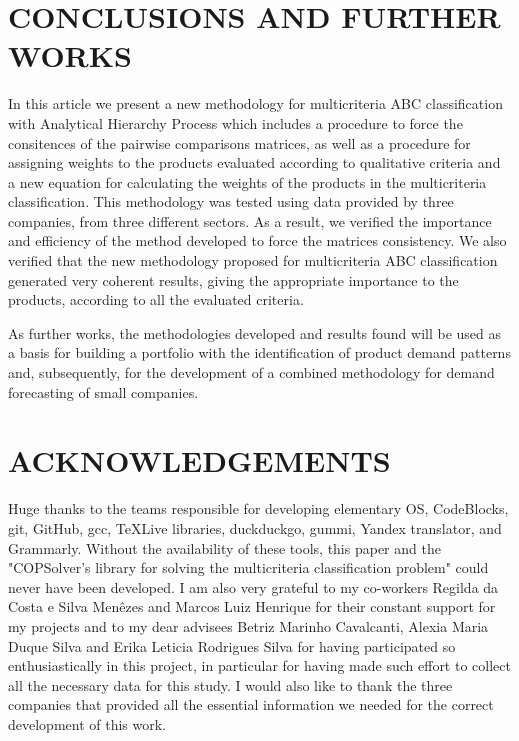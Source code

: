 \documentclass[10pt,fleqn,a4paper,twoside]{article}
\begin{document}
	\section{CONCLUSIONS AND FURTHER WORKS}
    
    In this article we present a new methodology for multicriteria ABC classification with Analytical Hierarchy Process which includes a procedure to force the consitences of the pairwise comparisons matrices, as well as a procedure for assigning weights to the products evaluated according to qualitative criteria and a new equation for calculating the weights of the products in the multicriteria classification. This methodology was tested using data provided by three companies, from three different sectors. As a result, we verified the importance and efficiency of the method developed to force the matrices consistency. We also verified that the new methodology proposed for multicriteria ABC classification generated very coherent results, giving the appropriate importance to the products, according to all the evaluated criteria. 

As further works, the methodologies developed and results found will be used as a basis for building a portfolio with the identification of product demand patterns and, subsequently, for the development of a combined methodology for demand forecasting of small companies. 

    \section{ACKNOWLEDGEMENTS}
    
Huge thanks to the teams responsible for developing elementary OS, CodeBlocks, git, GitHub, gcc, TeXLive libraries, duckduckgo, gummi, Yandex translator, and Grammarly. Without the availability of these tools, this paper and the "COPSolver's library for solving the multicriteria classification problem" could never have been developed. I am also very grateful to my co-workers Regilda da Costa e Silva Menêzes and Marcos Luiz Henrique for their constant support for my projects and to my dear advisees Betriz Marinho Cavalcanti, Alexia Maria Duque Silva and Erika Leticia Rodrigues Silva for having participated so enthusiastically in this project, in particular for having made such effort to collect all the necessary data for this study. I would also like to thank the three companies that provided all the essential information we needed for the correct development of this work. \\
        
\end{document}
